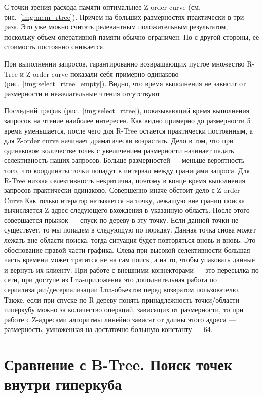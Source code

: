 С точки зрения расхода памяти оптимальнее Z-order curve (см. рис.~\ref{img:mem_rtree}).
Причем на больших размерностях практически в три раза.
Это уже можно считать релевантным положительным результатом, поскольку
объем оперативной памяти обычно ограничен. Но с другой стороны,
её стоимость постоянно снижается.

При выполнении запросов, гарантированно возвращающих пустое множество
R-Tree и Z-order curve показали себя примерно одинаково (рис.~\ref{img:select_rtree_empty}).
Видно, что время выполнения не зависит от размерности и нежелательные чтения отсутствуют.

Последний график (рис.~\ref{img:select_rtree}), показывающий время выполнения запросов на чтение наиболее интересен.
Как видно примерно до размерности 5 время уменьшается,
после чего для R-Tree остается практически постоянным, а для Z-order
curve начинает драматически возрастать.
Дело в том, что при одинаковом количестве точек с увеличением размерности
начинает падать селективность наших запросов. Больше размерностей ---
меньше вероятность того, что координаты точки попадут в интервал между
границами запроса. Для R-Tree низкая селективность некритична,
поэтому в конце время выполнения запросов практически одинаково.
Совершенно иначе обстоит дело с Z-order Curve
Как только итератор натыкается на точку, лежащую вне границ поиска
вычисляется Z-адрес следующего вхождения в указанную область.
После этого совершается прыжок --- спуск по дереву в эту точку.
Если данной точки не существует, то мы попадем в следующую по порядку.
Данная точка снова может лежать вне области поиска, тогда ситуация будет повторяться вновь и вновь. Это обоснование правой части графика.
Слева при высокой селективности большая часть времени может тратится
не на сам поиск, а на то, чтобы упаковать данные и вернуть их клиенту.
При работе с внешними коннекторами --- это пересылка по сети,
при доступе из Lua-приложения это дополнительная работа по сериализации/десериализации Lua-объектов перед возвратом пользователю.
Также, если при спуске по R-дереву понять принадлежность точки/области гиперкубу 
можно за количество операций, зависящих от размерности,
то при работе с Z-адресами алгоритмы линейно зависят от длины этого адреса ---
размерность, умноженная на достаточно большую константу --- 64.

\section{Сравнение с B-Tree. Поиск точек внутри гиперкуба}

